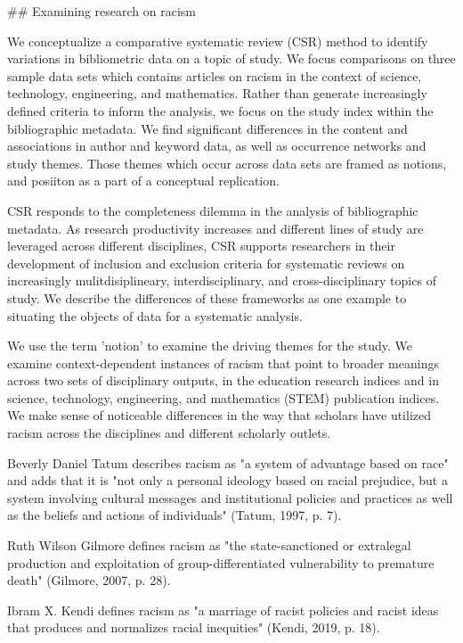 {{## Examining research on racism

We conceptualize a comparative systematic review (CSR) method to identify variations in bibliometric data on a topic of study. We focus comparisons on three sample data sets which contains articles on racism in the context of science, technology, engineering, and mathematics. Rather than generate increasingly defined criteria to inform the analysis, we focus on the study index within the bibliographic metadata. We find significant differences in the content and associations in author and keyword data, as well as occurrence networks and study themes. Those themes which occur across data sets are framed as notions, and posiiton as a part of a conceptual replication.

CSR responds to the completeness dilemma in the analysis of bibliographic metadata. As research productivity increases and different lines of study are leveraged across different disciplines, CSR supports researchers in their development of inclusion and exclusion criteria for systematic reviews on increasingly mulitdisiplineary, interdisciplinary, and cross-disciplinary topics of study. We describe the differences of these frameworks as one example to situating the objects of data for a systematic analysis.

We use the term 'notion' to examine the driving themes for the study. We examine context-dependent instances of racism that point to broader meanings across two sets of disciplinary outputs, in the education research indices and in science, technology, engineering, and mathematics (STEM) publication indices. We make sense of noticeable differences in the way that scholars have utilized racism across the disciplines and different scholarly outlets.

Beverly Daniel Tatum describes racism as "a system of advantage based on race" and adds that it is "not only a personal ideology based on racial prejudice, but a system involving cultural messages and institutional policies and practices as well as the beliefs and actions of individuals" (Tatum, 1997, p. 7).

Ruth Wilson Gilmore defines racism as "the state-sanctioned or extralegal production and exploitation of group-differentiated vulnerability to premature death" (Gilmore, 2007, p. 28).

Ibram X. Kendi defines racism as "a marriage of racist policies and racist ideas that produces and normalizes racial inequities" (Kendi, 2019, p. 18).

}}
